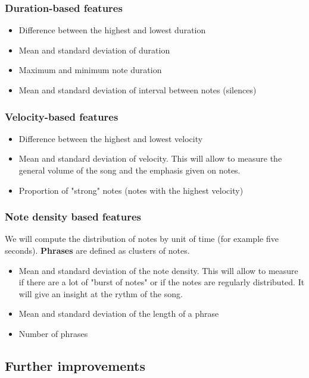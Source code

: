 \documentclass[a4paper,12pt]{article}
\begin{document}
    \subsubsection{Duration-based features}
        \begin{itemize}
            \item Difference between the highest and lowest duration
            \item Mean and standard deviation of duration
            \item Maximum and minimum note duration
            \item Mean and standard deviation of interval between notes (silences)
        \end{itemize}

    \subsubsection{Velocity-based features}
        \begin{itemize}
            \item Difference between the highest and lowest velocity
            \item Mean and standard deviation of velocity. This will allow to measure the general volume of the song and the emphasis given on notes.
            \item Proportion of "strong" notes (notes with the highest velocity)
        \end{itemize}

    \subsubsection{Note density based features}
        We will compute the distribution of notes by unit of time (for example five seconds). \textbf{Phrases} are defined as clusters of notes.
    \begin{itemize}     
        \item Mean and standard deviation of the note density. This will allow to measure if there are a lot of "burst of notes" or if the notes are regularly distributed. It will give an insight at the rythm of the song.
        \item Mean and standard deviation of the length of a phrase
        \item Number of phrases
    \end{itemize}

\subsection{Further improvements}
\end{document}
